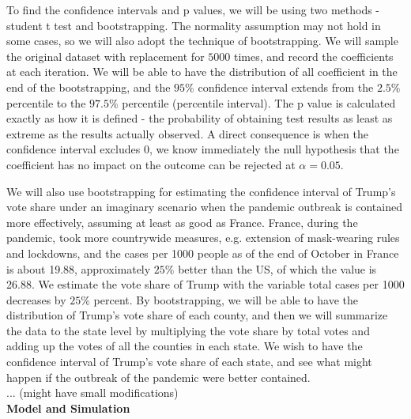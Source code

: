 \documentclass[12pt]{article}
\begin{document}
To find the confidence intervals and p values, we will be using two methods - student t test and bootstrapping. The normality assumption may not hold in some cases, so we will also adopt the technique of bootstrapping. We will sample the original dataset with replacement for $5000$ times, and record the coefficients at each iteration. We will be able to have the distribution of all coefficient in the end of the bootstrapping, and the $95\%$ confidence interval extends from the $2.5\%$ percentile to the $97.5\%$ percentile (percentile interval). The p value is calculated exactly as how it is defined - the probability of obtaining test results as least as extreme as the results actually observed. A direct consequence is when the confidence interval excludes 0, we know immediately the null hypothesis that the coefficient has no impact on the outcome can be rejected at $\alpha = 0.05$.

We will also use bootstrapping for estimating the confidence interval of Trump's vote share under an imaginary scenario when the pandemic outbreak is contained more effectively, assuming at least as good as France. France, during the pandemic, took more countrywide measures, e.g. extension of mask-wearing rules and lockdowns, and the cases per 1000 people as of the end of October in France is about 19.88, approximately $25\%$ better than the US, of which the value is 26.88. We estimate the vote share of Trump with the variable total cases per 1000 decreases by $25\%$ percent. By bootstrapping, we will be able to have the distribution of Trump's vote share of each county, and then we will summarize the data to the state level by multiplying the vote share by total votes and adding up the votes of all the counties in each state. We wish to have the confidence interval of Trump's vote share of each state, and see what might happen if the outbreak of the pandemic were better contained. \\


... (might have small modifications) \\


{\bf Model and Simulation} \\
\end{document}
